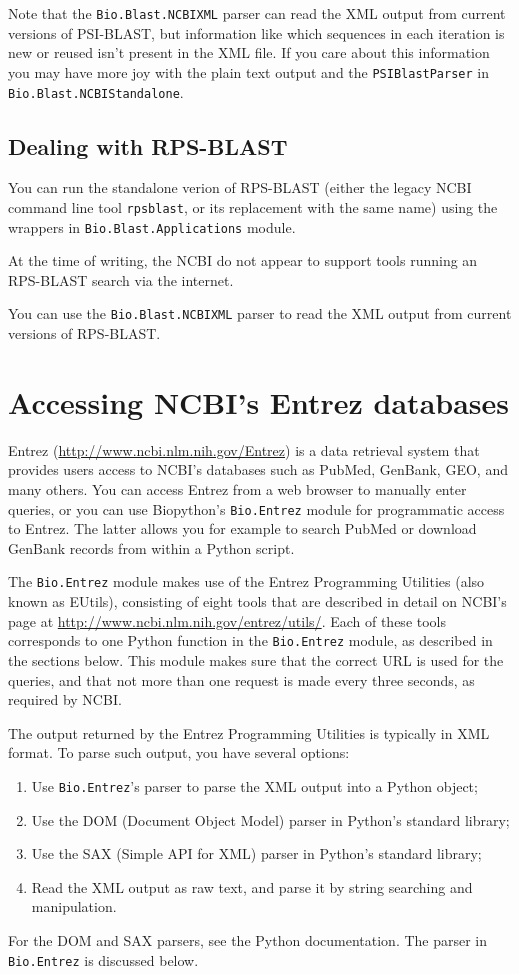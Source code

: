 \documentclass{report}
\begin{document}
Note that the \verb|Bio.Blast.NCBIXML| parser can read the XML output from
current versions of PSI-BLAST, but information like which sequences in each
iteration is new or reused isn't present in the XML file.
If you care about this information you may have more joy with the plain text
output and the \verb|PSIBlastParser| in \verb|Bio.Blast.NCBIStandalone|.

\section{Dealing with RPS-BLAST}

You can run the standalone verion of RPS-BLAST (either the legacy NCBI
command line tool \verb|rpsblast|, or its replacement with the same name)
using the wrappers in \verb|Bio.Blast.Applications| module.

At the time of writing, the NCBI do not appear to support tools running an
RPS-BLAST search via the internet.

You can use the \verb|Bio.Blast.NCBIXML| parser to read the XML output from
current versions of RPS-BLAST.

\chapter{Accessing NCBI's Entrez databases}
\label{chapter:entrez}

Entrez (\url{http://www.ncbi.nlm.nih.gov/Entrez}) is a data retrieval system that provides users access to NCBI's databases such as PubMed, GenBank, GEO, and many others. You can access Entrez from a web browser to manually enter queries, or you can use Biopython's \verb+Bio.Entrez+ module for programmatic access to Entrez. The latter allows you for example to search PubMed or download GenBank records from within a Python script.

The \verb+Bio.Entrez+ module makes use of the Entrez Programming Utilities (also known as EUtils), consisting of eight tools that are described in detail on NCBI's page at \url{http://www.ncbi.nlm.nih.gov/entrez/utils/}.
Each of these tools corresponds to one Python function in the \verb+Bio.Entrez+ module, as described in the sections below. This module makes sure that the correct URL is used for the queries, and that not more than one request is made every three seconds, as required by NCBI.

The output returned by the Entrez Programming Utilities is typically in XML format. To parse such output, you have several options:
\begin{enumerate}
  \item Use \verb+Bio.Entrez+'s parser to parse the XML output into a Python object;
  \item Use the DOM (Document Object Model) parser in Python's standard library;
  \item Use the SAX (Simple API for XML) parser in Python's standard library;
  \item Read the XML output as raw text, and parse it by string searching and manipulation.
\end{enumerate}
For the DOM and SAX parsers, see the Python documentation. The parser in \verb+Bio.Entrez+ is discussed below.
\end{document}
